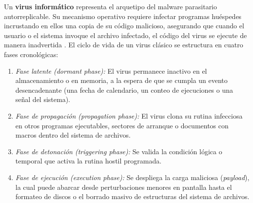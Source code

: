 \documentclass[12pt]{article}
\begin{document}
Un \textbf{virus informático} representa el arquetipo del malware parasitario autorreplicable. Su mecanismo operativo requiere infectar programas huéspedes incrustando en ellos una copia de su código malicioso, asegurando que cuando el usuario o el sistema invoque el archivo infectado, el código del virus se ejecute de manera inadvertida \parencite[\S 19.5.2, p.\ 943]{deitel2004operating}. El ciclo de vida de un virus clásico se estructura en cuatro fases cronológicas:
\begin{enumerate}[noitemsep, topsep=2pt]
    \item \textit{Fase latente (\textit{dormant phase}):} El virus permanece inactivo en el almacenamiento o en memoria, a la espera de que se cumpla un evento desencadenante (una fecha de calendario, un conteo de ejecuciones o una señal del sistema).
    \item \textit{Fase de propagación (\textit{propagation phase}):} El virus clona su rutina infecciosa en otros programas ejecutables, sectores de arranque o documentos con macros dentro del sistema de archivos.
    \item \textit{Fase de detonación (\textit{triggering phase}):} Se valida la condición lógica o temporal que activa la rutina hostil programada.
    \item \textit{Fase de ejecución (\textit{execution phase}):} Se despliega la carga maliciosa (\textit{payload}), la cual puede abarcar desde perturbaciones menores en pantalla hasta el formateo de discos o el borrado masivo de estructuras del sistema de archivos.
\end{enumerate}
\end{document}
